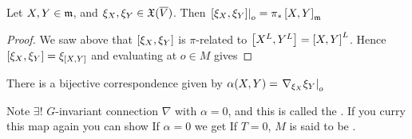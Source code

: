 \documentclass{article}
\begin{document}
\begin{lemma}
	Let $X,Y \in \mf{m}$, and $\xi_X,\xi_Y \in \mf{X}(\overline{V})$. Then $\ev{\comm[\xi_X]{\xi_Y}}{o} = \pi_\ast \comm[X]{Y}_{\mf{m}}$
\end{lemma}
\begin{proof}
	We saw above that $\comm[\xi_X]{\xi_Y}$ is $\pi$-related to $\comm[X^L]{Y^L} = \comm[X]{Y}^L$. Hence $\comm[\xi_X]{\xi_Y} = \xi_{\comm[X]{Y}}$ and evaluating at $o \in M$ gives 
\end{proof}

\begin{theorem}[Nomizu]
	There is a bijective correspondence
	given by 
	$\alpha(X,Y) = \ev{\nabla_{\xi_X} \xi_Y}{o}
	$
\end{theorem}
Note $\exists !$ $G$-invariant connection $\nabla$ with $\alpha=0$, and this is called the . If you curry this map again you can show 
If $\alpha=0$ we get 
If $T=0$, $M$ is said to be . 

\end{document}
